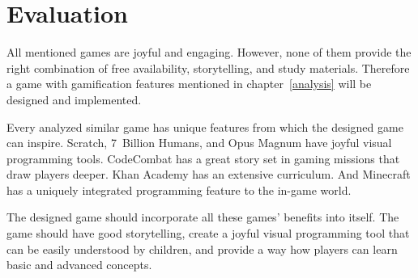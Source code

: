 \pagebreak
\section{Evaluation}

All mentioned games are joyful and engaging.
However, none of them provide the right combination of free availability, storytelling, and study materials.
Therefore a game with gamification features mentioned in chapter~\ref{analysis} will be designed and implemented.

Every analyzed similar game has unique features from which the designed game can inspire. 
Scratch, 7~Billion Humans, and Opus Magnum have joyful visual programming tools.
CodeCombat has a great story set in gaming missions that draw players deeper.
Khan Academy has an extensive curriculum.
And Minecraft has a uniquely integrated programming feature to the in-game world.

The designed game should incorporate all these games' benefits into itself.
The game should have good storytelling, create a joyful visual programming tool that can be easily understood by children, and provide a way how players can learn basic and advanced concepts. 



\blind[25] %
